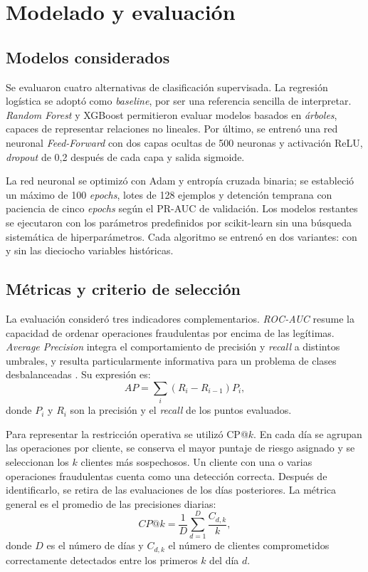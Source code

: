 \section{Modelado y evaluación}

\subsection{Modelos considerados}
Se evaluaron cuatro alternativas de clasificación supervisada. La regresión logística se adoptó como \textit{baseline}, por ser una referencia sencilla de interpretar. \textit{Random Forest} y XGBoost permitieron evaluar modelos basados en \textit{árboles}, capaces de representar relaciones no lineales. Por último, se entrenó una red neuronal \textit{Feed-Forward} con dos capas ocultas de 500 neuronas y activación ReLU, \textit{dropout} de 0,2 después de cada capa y salida sigmoide.

La red neuronal se optimizó con Adam y entropía cruzada binaria; se estableció un máximo de 100 \textit{epochs}, lotes de 128 ejemplos y detención temprana con paciencia de cinco \textit{epochs} según el PR-AUC de validación. Los modelos restantes se ejecutaron con los parámetros predefinidos por scikit-learn sin una búsqueda sistemática de hiperparámetros. Cada algoritmo se entrenó en dos variantes: con y sin las dieciocho variables históricas.

\subsection{Métricas y criterio de selección}
La evaluación consideró tres indicadores complementarios. \textit{ROC-AUC} resume la capacidad de ordenar operaciones fraudulentas por encima de las legítimas. \textit{Average Precision} integra el comportamiento de precisión y \textit{recall} a distintos umbrales, y resulta particularmente informativa para un problema de clases desbalanceadas \cite{handbook}. Su expresión es:
\begin{equation}
\label{eq:ap}
AP=\sum_{i}(R_i-R_{i-1})P_i,
\end{equation}
donde $P_i$ y $R_i$ son la precisión y el \textit{recall} de los puntos evaluados.

Para representar la restricción operativa se utilizó CP@$k$. En cada día se agrupan las operaciones por cliente, se conserva el mayor puntaje de riesgo asignado y se seleccionan los $k$ clientes más sospechosos. Un cliente con una o varias operaciones fraudulentas cuenta como una detección correcta. Después de identificarlo, se retira de las evaluaciones de los días posteriores. La métrica general es el promedio de las precisiones diarias:
\begin{equation}
\label{eq:cp}
CP@k=\frac{1}{D}\sum_{d=1}^{D}\frac{C_{d,k}}{k},
\end{equation}
donde $D$ es el número de días y $C_{d,k}$ el número de clientes comprometidos correctamente detectados entre los primeros $k$ del día $d$.

